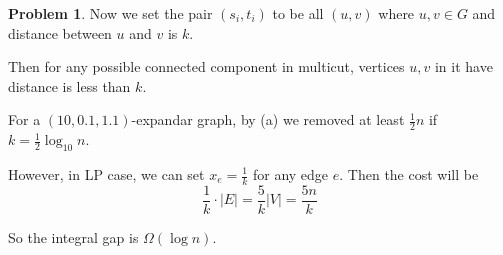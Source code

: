 \documentclass[a4paper]{article}
\theoremstyle{definition}
\newtheorem{problem}{Problem}
\theoremstyle{plain}
\newcommand{\<}{\left<}
\renewcommand{\>}{\right>}
\numberwithin{equation}{problem}
\begin{document}
\begin{problem}




Now we set the pair  $ (s_i,t_i) $ to be all   $ (u,v) $ where  $ u,v\in G $ and distance between  $ u $ and  $ v $ is  $ k $.

Then for any possible connected component in  multicut, vertices  $ u,v $ in it have  distance  is less than  $ k $.

For a  $ (10,0.1,1.1) $-expandar graph, by (a)  we removed at least  $ \frac{1}{2}n $ if  $ k=\frac{1}{2}\log_{10}n $.

However, in LP case, we can set   $ x_e=\frac{1}{k} $ for any edge  $ e $. Then the cost will be 
\[\frac{1}{k}\cdot |E|=\frac{5}{k}|V|=\frac{5n}{k}\]

So the integral gap is  $ \Omega(\log n) $. 

\end{problem}
\end{document}
